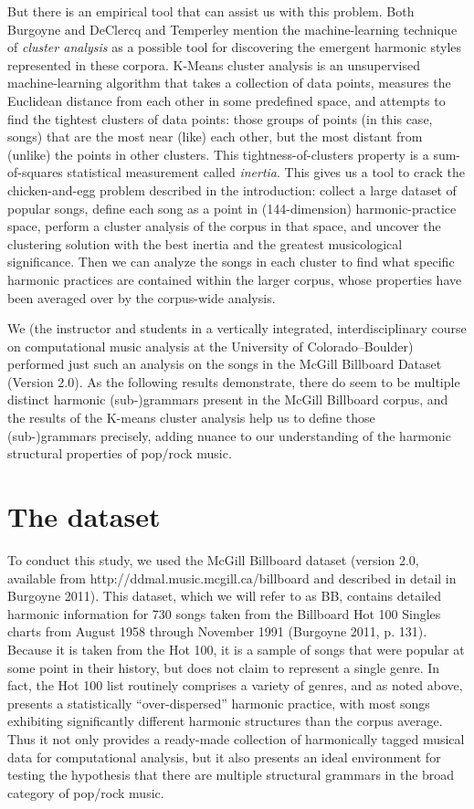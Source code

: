 But there is an empirical tool that can assist us with this problem. Both Burgoyne and DeClercq and Temperley mention the machine-learning technique of \emph{cluster analysis} as a possible tool for discovering the emergent harmonic styles represented in these corpora. K-Means cluster analysis is an unsupervised machine-learning algorithm that takes a collection of data points, measures the Euclidean distance from each other in some predefined space, and attempts to find the tightest clusters of data points: those groups of points (in this case, songs) that are the most near (like) each other, but the most distant from (unlike) the points in other clusters. This tightness-of-clusters property is a sum-of-squares statistical measurement called \emph{inertia}. This gives us a tool to crack the chicken-and-egg problem described in the introduction: collect a large dataset of popular songs, define each song as a point in (144-dimension) harmonic-practice space, perform a cluster analysis of the corpus in that space, and uncover the clustering solution with the best inertia and the greatest musicological significance. Then we can analyze the songs in each cluster to find what specific harmonic practices are contained within the larger corpus, whose properties have been averaged over by the corpus-wide analysis.

We (the instructor and students in a vertically integrated, interdisciplinary course on computational music analysis at the University of Colorado–Boulder) performed just such an analysis on the songs in the McGill Billboard Dataset (Version 2.0). As the following results demonstrate, there do seem to be multiple distinct harmonic (sub-)grammars present in the McGill Billboard corpus, and the results of the K-means cluster analysis help us to define those (sub-)grammars precisely, adding nuance to our understanding of the harmonic structural properties of pop\slash rock music.

\chapter{The dataset}
\label{thedataset}

To conduct this study, we used the McGill Billboard dataset (version 2.0, available from http:\slash \slash ddmal.music.mcgill.ca\slash billboard and described in detail in Burgoyne 2011). This dataset, which we will refer to as BB, contains detailed harmonic information for 730 songs taken from the Billboard Hot 100 Singles charts from August 1958 through November 1991 (Burgoyne 2011, p. 131). Because it is taken from the Hot 100, it is a sample of songs that were popular at some point in their history, but does not claim to represent a single genre. In fact, the Hot 100 list routinely comprises a variety of genres, and as noted above, presents a statistically ``over-dispersed'' harmonic practice, with most songs exhibiting significantly different harmonic structures than the corpus average. Thus it not only provides a ready-made collection of harmonically tagged musical data for computational analysis, but it also presents an ideal environment for testing the hypothesis that there are multiple structural grammars in the broad category of pop\slash rock music.


